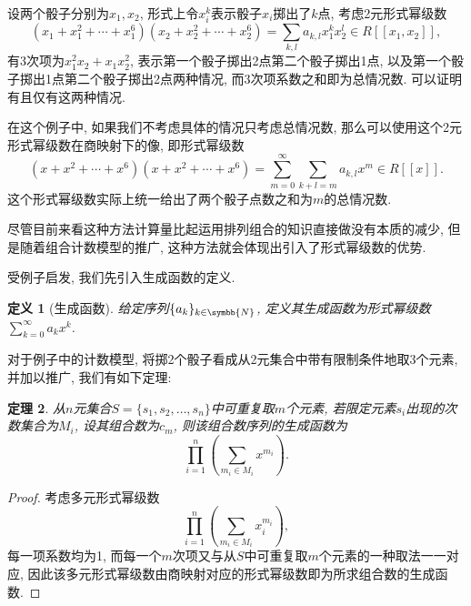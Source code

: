 \documentclass[chinese]{assignment}[2019/10/15]
\newcommand{\BN}{\symbb{N}}
\newcommand{\lr}[3]{\left#1#3\right#2}
\theoremstyle{plain}
\newtheorem{theorem}{定理}[section]
\newtheorem{definition}[theorem]{定义}
\begin{document}
    \begin{solution}
        设两个骰子分别为$x_1, x_2$, 形式上令$x_i^k$表示骰子$x_i$掷出了$k$点, 考虑2元形式幂级数
        \begin{equation}
            \lr(){x_1+x_1^2+\dotsb+x_1^6}\lr(){x_2+x_2^2+\dotsb+x_2^6}=\sum_{k, l}a_{k, l}x_1^kx_2^l \in R[[x_1, x_2]],
        \end{equation}
        有3次项为$x_1^2x_2+x_1x_2^2$, 表示第一个骰子掷出2点第二个骰子掷出1点, 以及第一个骰子掷出1点第二个骰子掷出2点两种情况, 而3次项系数之和即为总情况数. 可以证明有且仅有这两种情况.
    \end{solution}

    在这个例子中, 如果我们不考虑具体的情况只考虑总情况数, 那么可以使用这个2元形式幂级数在商映射下的像, 即形式幂级数
    \begin{equation}
        \lr(){x+x^2+\dotsb+x^6}\lr(){x+x^2+\dotsb+x^6}=\sum_{m=0}^\infty\sum_{k+l=m}a_{k, l}x^m \in R[[x]].
    \end{equation}
    这个形式幂级数实际上统一给出了两个骰子点数之和为$m$的总情况数.

    尽管目前来看这种方法计算量比起运用排列组合的知识直接做没有本质的减少, 但是随着组合计数模型的推广, 这种方法就会体现出引入了形式幂级数的优势.

    受例子启发, 我们先引入生成函数的定义.

    \begin{definition}[生成函数]
        给定序列$\{a_k\}_{k\in\BN}$, 定义其生成函数为形式幂级数$\sum_{k=0}^\infty a_kx^k$.
    \end{definition}

    对于例子中的计数模型, 将掷2个骰子看成从2元集合中带有限制条件地取3个元素, 并加以推广, 我们有如下定理:

    \begin{theorem}\label{thm: ogf-comb}
        从$n$元集合$S = \{s_1, s_2, \dotsc, s_n\}$中可重复取$m$个元素, 若限定元素$s_i$出现的次数集合为$M_i$, 设其组合数为$c_m$, 则该组合数序列的生成函数为
        \begin{equation}
            \prod_{i=1}^n\left(\sum_{m_i\in M_i}x^{m_i}\right).
        \end{equation}
    \end{theorem}

    \begin{proof}
        考虑多元形式幂级数
        \begin{equation}
            \prod_{i=1}^n\left(\sum_{m_i\in M_i}x_i^{m_i}\right),
        \end{equation}
        每一项系数均为1, 而每一个$m$次项又与从$S$中可重复取$m$个元素的一种取法一一对应, 因此该多元形式幂级数由商映射对应的形式幂级数即为所求组合数的生成函数.
    \end{proof}
\end{document}
